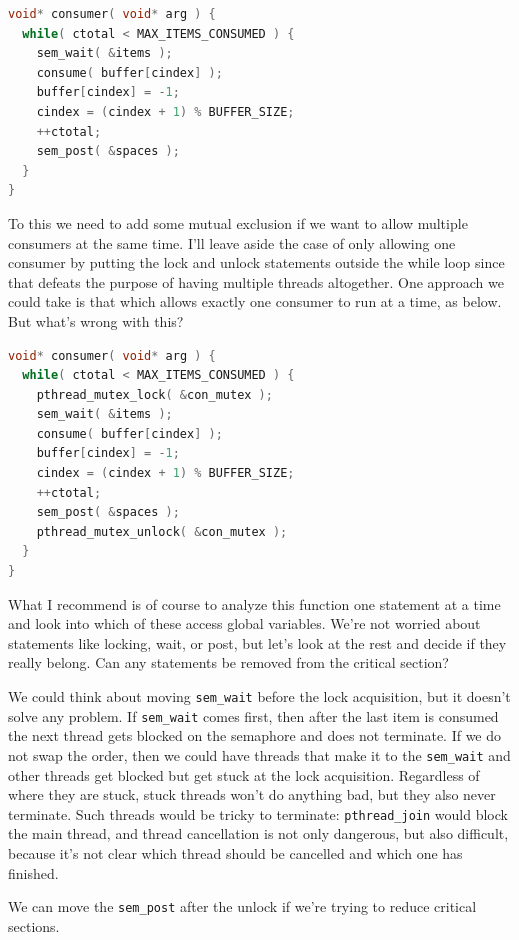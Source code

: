 \documentclass[a4paper]{report}
\begin{document}
\begin{lstlisting}[language=C]
void* consumer( void* arg ) { 
  while( ctotal < MAX_ITEMS_CONSUMED ) {
    sem_wait( &items );
    consume( buffer[cindex] );
    buffer[cindex] = -1;
    cindex = (cindex + 1) % BUFFER_SIZE;
    ++ctotal;
    sem_post( &spaces );
  }
}
\end{lstlisting}

To this we need to add some mutual exclusion if we want to allow multiple consumers at the same time. I'll leave aside the case of only allowing one consumer by putting the lock and unlock statements outside the while loop since that defeats the purpose of having multiple threads altogether. One approach we could take is that which allows exactly one consumer to run at a time, as below. But what's wrong with this?

\begin{lstlisting}[language=C]
void* consumer( void* arg ) { 
  while( ctotal < MAX_ITEMS_CONSUMED ) {
    pthread_mutex_lock( &con_mutex );
    sem_wait( &items );
    consume( buffer[cindex] );
    buffer[cindex] = -1;
    cindex = (cindex + 1) % BUFFER_SIZE;
    ++ctotal;
    sem_post( &spaces );
    pthread_mutex_unlock( &con_mutex );
  }
}
\end{lstlisting}

What I recommend is of course to analyze this function one statement at a time and look into which of these access global variables. We're not worried about statements like locking, wait, or post, but let's look at the rest and decide if they really belong. Can any statements be removed from the critical section?

We could think about moving {\tt sem\_wait} before the lock acquisition, but it doesn't solve any problem. If {\tt sem\_wait} comes first, then after the last item is consumed the next thread gets blocked on the semaphore and does not terminate. If we do not swap the order, then we could have threads that make it to the {\tt sem\_wait} and other threads get blocked but get stuck at the lock acquisition. Regardless of where they are stuck, stuck threads won't do anything bad, but they also never terminate. Such threads would be tricky to terminate: {\tt pthread\_join} would block the main thread, and thread cancellation is not only dangerous, but also difficult, because it's not clear which thread should be cancelled and which one has finished.

We can move the {\tt sem\_post} after the unlock if we're trying to reduce critical sections.
\end{document}

